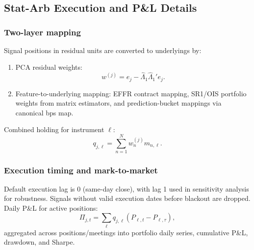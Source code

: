 \subsection{Stat-Arb Execution and P\&L Details}
\label{app:statarb_execution_pnl}

\subsubsection*{Two-layer mapping}
Signal positions in residual units are converted to underlyings by:
\begin{enumerate}
    \item PCA residual weights:
    \[
    w^{(j)} = e_j - \hat{\Lambda}_{1}\hat{\Lambda}_{1}'e_j.
    \]
    \item Feature-to-underlying mapping:
    EFFR contract mapping, SR1/OIS portfolio weights from matrix estimators,
    and prediction-bucket mappings via canonical bps map.
\end{enumerate}
Combined holding for instrument $\ell$:
\[
q_{j,\ell}=\sum_{n=1}^{N} w_n^{(j)} m_{n,\ell}.
\]

\subsubsection*{Execution timing and mark-to-market}
Default execution lag is 0 (same-day close), with lag 1 used in sensitivity analysis for
robustness. Signals without valid execution dates before blackout are dropped.
Daily P\&L for active positions:
\[
\Pi_{j,t}=\sum_{\ell} q_{j,\ell}(P_{\ell,t}-P_{\ell,\tau}),
\]
aggregated across positions/meetings into portfolio daily series, cumulative
P\&L, drawdown, and Sharpe.

